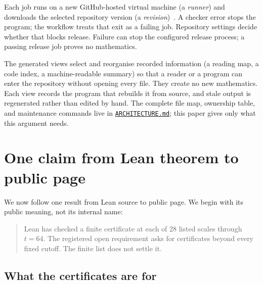 \documentclass[11pt]{article}
\begin{document}
Each job runs on a new GitHub-hosted virtual machine (a \emph{runner}) and
downloads the selected repository version (a \emph{revision})~\cite{githubrunners}.
A checker error stops the program; the workflow
treats that exit as a failing job.  Repository settings decide whether that
blocks release.  Failure can stop the configured release process; a passing
release job proves no mathematics.

The generated views select and reorganise recorded information (a reading
map, a code index, a
machine-readable summary) so that a reader or a program can enter the
repository without opening every file.  They create no new mathematics.  Each
view records the program that rebuilds it from source, and stale output is
regenerated rather than edited by hand.  The complete file map, ownership table, and
maintenance commands live in
\href{https://github.com/wcook04/plectis-lean-erdos249-257/blob/main/ARCHITECTURE.md}{\texttt{ARCHITECTURE.md}};
this paper gives only what this argument needs.

\FloatBarrier
\section{One claim from Lean theorem to public page}\label{sec:example}

We now follow one result from Lean source to public page.  We begin with its
public meaning, not its internal name:

\begin{quote}
Lean has checked a finite certificate at each of 28 listed scales through
$t = 64$.  The registered open requirement asks for certificates beyond every
fixed cutoff.  The finite list does not settle it.
\end{quote}

\subsection{What the certificates are for}\label{sec:mathrole}
\end{document}
